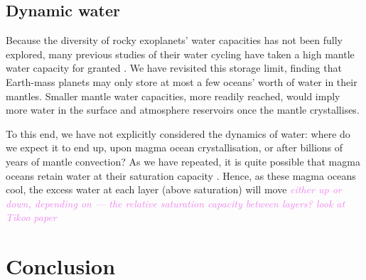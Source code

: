\documentclass[linenumbers]{aastex631}
\newcommand{\todo}[1]{\textit{\textcolor{violet}{{#1}}}}
\begin{document}
\subsection{Dynamic water}

Because the diversity of rocky exoplanets' water capacities has not been fully explored, many previous studies of their water cycling have taken a high mantle water capacity for granted \citep{cowan_water_2014, schaefer_persistence_2015, moore_keeping_2020}. We have revisited this storage limit, finding that Earth-mass planets may only store at most a few oceans' worth of water in their mantles. Smaller mantle water capacities, more readily reached, would imply more water in the surface and atmosphere reservoirs once the mantle crystallises.

To this end, we have not explicitly considered the dynamics of water: where do we expect it to end up, upon magma ocean crystallisation, or after billions of years of mantle convection? As we have repeated, it is quite possible that magma oceans retain water at their saturation capacity \citep{dorn_hidden_2021}. Hence, as these magma oceans cool, the excess water at each layer (above saturation) will move \todo{either up or down, depending on --- the relative saturation capacity between layers? look at Tikoo paper}



\section{Conclusion}




\end{document}
